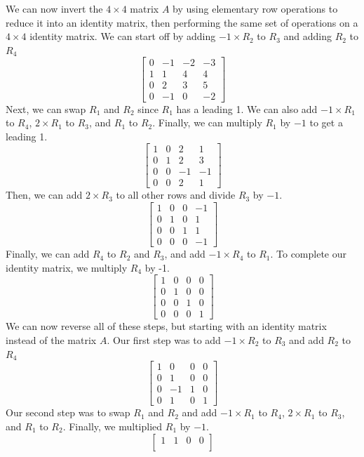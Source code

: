 \documentclass[11pt, letterpaper, twoside]{article}
\begin{document}
\begin{enumerate}
\begin{enumerate}[label=(\alph*)]
We can now invert the $4\times4$ matrix $A$ by using elementary row operations to reduce it into an identity matrix, then performing the same set of operations on a $4\times4$ identity matrix. We can start off by adding $-1\times R_2$ to $R_3$ and adding $R_2$ to $R_4$
$$\begin{bmatrix}
0 & -1 & -2&-3\\
1 & 1 & 4 & 4\\
0 & 2 & 3 & 5\\
0 & -1 & 0 & -2
\end{bmatrix}$$
Next, we can swap $R_1$ and $R_2$ since $R_1$ has a leading 1. We can also add $-1\times R_1$ to $R_4$, $2\times R_1 $ to $R_3$, and $R_1$ to $R_2$. Finally, we can multiply $R_1$ by $-1$ to get a leading 1.
$$\begin{bmatrix}
1 & 0 & 2 & 1\\
0 & 1 & 2&3\\
0 & 0 & -1 & -1\\
0 & 0 & 2 & 1
\end{bmatrix}$$
Then, we can add $2\times R_3$ to all other rows and divide $R_3$ by $-1$.
$$\begin{bmatrix}
1 & 0 & 0 & -1\\
0 & 1 & 0 & 1\\
0 & 0 & 1 & 1\\
0 & 0 & 0 & -1
\end{bmatrix}$$
Finally, we can add $R_4$ to $R_2$ and $R_3$, and add $-1\times R_4$ to $R_1$. To complete our identity matrix, we multiply $R_4$ by -1.
$$\begin{bmatrix}
1 & 0 & 0 & 0\\
0 & 1 & 0&0\\
0 & 0 & 1 & 0\\
0 & 0 & 0 & 1
\end{bmatrix}$$
We can now reverse all of these steps, but starting with an identity matrix instead of the matrix $A$. Our first step was to add $-1\times R_2$ to $R_3$ and add $R_2$ to $R_4$
$$\begin{bmatrix}
1 & 0 & 0 & 0\\
0 & 1 & 0&0\\
0 & -1 & 1 & 0\\
0 & 1 & 0 & 1
\end{bmatrix}$$
Our second step was to swap $R_1$ and $R_2$ and add $-1\times R_1$ to $R_4$, $2\times R_1 $ to $R_3$, and $R_1$ to $R_2$. Finally, we multiplied $R_1$ by $-1$.
$$\begin{bmatrix}
1 & 1 & 0&0\\

\end{bmatrix}$$
\end{enumerate}
\end{enumerate}
\end{document}
